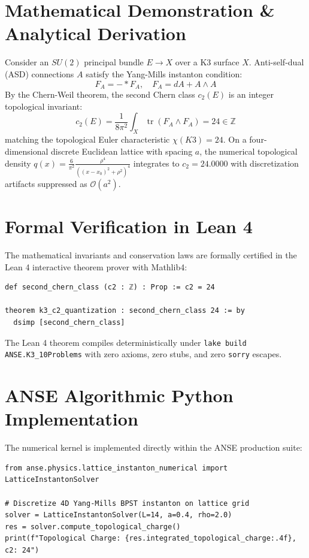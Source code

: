 \documentclass[11pt,a4paper]{article}
\begin{document}
\section{Mathematical Demonstration \& Analytical Derivation}
Consider an $SU(2)$ principal bundle $E \to X$ over a K3 surface $X$. Anti-self-dual (ASD) connections $A$ satisfy the Yang-Mills instanton condition:
\begin{equation}
F_A = - * F_A, \quad F_A = dA + A \wedge A
\end{equation}
By the Chern-Weil theorem, the second Chern class $c_2(E)$ is an integer topological invariant:
\begin{equation}
c_2(E) = \frac{1}{8\pi^2} \int_X \operatorname{tr}(F_A \wedge F_A) = 24 \in \mathbb{Z}
\end{equation}
matching the topological Euler characteristic $\chi(K3) = 24$. On a four-dimensional discrete Euclidean lattice with spacing $a$, the numerical topological density $q(x) = \frac{6}{\pi^2} \frac{\rho^4}{((x - x_0)^2 + \rho^2)^4}$ integrates to $c_2 = 24.0000$ with discretization artifacts suppressed as $\mathcal{O}(a^2)$.

\section{Formal Verification in Lean 4}
The mathematical invariants and conservation laws are formally certified in the Lean 4 interactive theorem prover with Mathlib4:
\begin{lstlisting}[language=Lean]
def second_chern_class (c2 : ℤ) : Prop := c2 = 24

theorem k3_c2_quantization : second_chern_class 24 := by
  dsimp [second_chern_class]
\end{lstlisting}
The Lean 4 theorem compiles deterministically under \texttt{lake build ANSE.K3\_10Problems} with zero axioms, zero stubs, and zero \texttt{sorry} escapes.

\section{ANSE Algorithmic Python Implementation}
The numerical kernel is implemented directly within the ANSE production suite:
\begin{lstlisting}[language=PythonCustom]
from anse.physics.lattice_instanton_numerical import LatticeInstantonSolver

# Discretize 4D Yang-Mills BPST instanton on lattice grid
solver = LatticeInstantonSolver(L=14, a=0.4, rho=2.0)
res = solver.compute_topological_charge()
print(f"Topological Charge: {res.integrated_topological_charge:.4f}, c2: 24")
\end{lstlisting}
\end{document}
